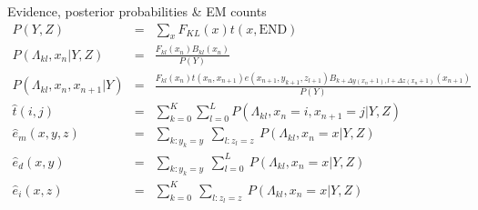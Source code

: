 \documentclass{beamer}
\begin{document}
\begin{frame}{}

\itemb
\item Evidence, posterior probabilities \& EM counts
\begin{eqnarray*}
P(Y,Z) & = & \sum_x F_{KL}(x) t(x,\mbox{END}) \\
P(\Lambda_{kl},x_n|Y,Z) & = & \frac{F_{kl}(x_n) B_{kl}(x_n)}{P(Y)} \\
P(\Lambda_{kl},x_n,x_{n+1}|Y) & = & \frac{F_{kl}(x_n) t(x_n,x_{n+1}) e(x_{n+1},y_{k+1},z_{l+1})
B_{k+\Delta y(x_n+1),l+\Delta z(x_n+1)}(x_{n+1})}{P(Y)} \\
\hat{t}(i,j) & = & \sum_{k=0}^K \sum_{l=0}^L P(\Lambda_{kl},x_n=i,x_{n+1}=j|Y,Z) \\
\hat{e}_m(x,y,z) & = & \sum_{k:y_k=y}\ \sum_{l:z_l=z}\ P(\Lambda_{kl},x_n=x|Y,Z) \\
\hat{e}_d(x,y) & = & \sum_{k:y_k=y}\ \sum_{l=0}^L\ P(\Lambda_{kl},x_n=x|Y,Z) \\
\hat{e}_i(x,z) & = & \sum_{k=0}^K\ \sum_{l:z_l=z}\ P(\Lambda_{kl},x_n=x|Y,Z)
\end{eqnarray*}
\iteme

\end{frame}
\end{document}

